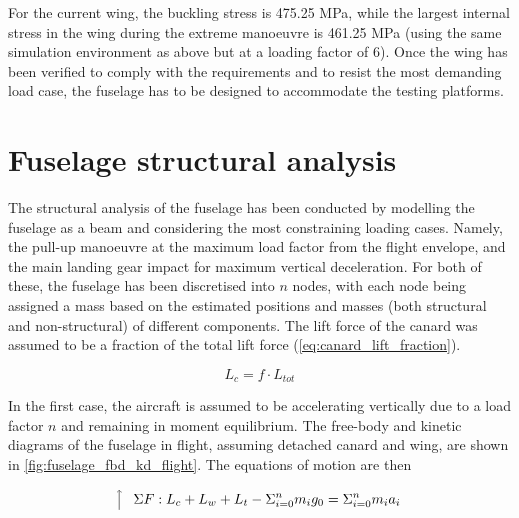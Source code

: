 For the current wing, the buckling stress is 475.25 MPa, while the largest internal stress in the wing during the extreme manoeuvre is 461.25 MPa (using the same simulation environment as above but at a loading factor of 6).
Once the wing has been verified to comply with the requirements and to resist the most demanding load case, the fuselage has to be designed to accommodate the testing platforms.







\section{Fuselage structural analysis}
\label{sec:fuselage_structural_analysis}
The structural analysis of the fuselage has been conducted by modelling the fuselage as a beam and considering the most constraining loading cases. Namely, the pull-up manoeuvre at the maximum load factor from the flight envelope, and the main landing gear impact for maximum vertical deceleration. For both of these, the fuselage has been discretised into $n$ nodes, with each node being assigned a mass based on the estimated positions and masses (both structural and non-structural) of different components. The lift force of the canard was assumed to be a fraction of the total lift force (\autoref{eq:canard_lift_fraction}).

\begin{equation}
    L_c=f\cdot L_{tot}
    \label{eq:canard_lift_fraction}
\end{equation}

In the first case, the aircraft is assumed to be accelerating vertically due to a load factor $n$ and remaining in moment equilibrium.
The free-body and kinetic diagrams of the fuselage in flight, assuming detached canard and wing, are shown in \autoref{fig:fuselage_fbd_kd_flight}. The equations of motion are then

\begin{equation}
     \tikz[baseline=-0.6ex]{\draw[->] (0,-0.25) -- (0,0.25);}
    \quad
    \Sigma F: L_c+L_w+L_t-\Sigma_{i=0}^n m_i g_0 = \Sigma_{i=0}^n m_i a_{i}
\end{equation}

